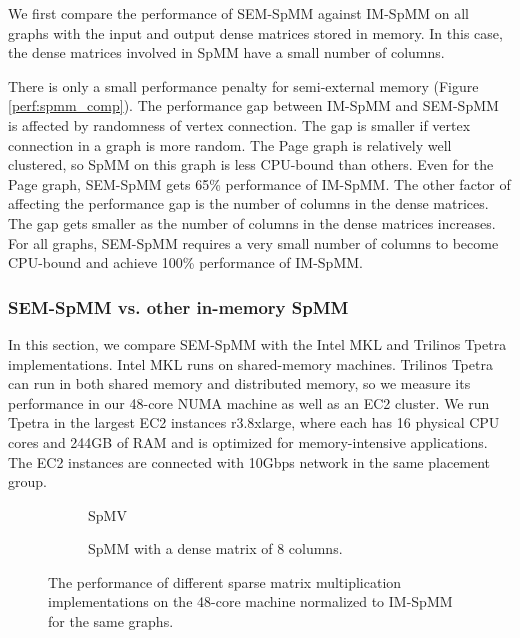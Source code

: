 We first compare the performance of SEM-SpMM against IM-SpMM on all graphs with
the input and output dense matrices stored in memory. In this case, the dense
matrices involved in SpMM have a small number of columns.

There is only a small performance penalty for semi-external memory (Figure
\ref{perf:spmm_comp}). The performance gap between IM-SpMM and SEM-SpMM
is affected by randomness of vertex connection. The gap is smaller if
vertex connection in a graph is more random. The Page graph is relatively
well clustered, so SpMM on this graph is less CPU-bound than others.
Even for the Page graph, SEM-SpMM gets 65\% performance of IM-SpMM.
The other factor of affecting the performance gap is the number of columns
in the dense matrices. The gap gets smaller as the number of columns in
the dense matrices increases. For all graphs, SEM-SpMM requires a very small
number of columns to become CPU-bound and achieve 100\% performance of IM-SpMM.

\subsubsection{SEM-SpMM vs. other in-memory SpMM}
In this section, we compare SEM-SpMM with the Intel MKL and Trilinos Tpetra
implementations. Intel MKL runs on shared-memory machines. Trilinos Tpetra can run in
both shared memory and distributed memory, so we measure its performance in
our 48-core NUMA machine as well as an EC2 cluster. We run Tpetra in the largest
EC2 instances r3.8xlarge, where each has 16 physical CPU cores and 244GB of RAM
and is optimized for memory-intensive applications. The EC2 instances are
connected with 10Gbps network in the same placement group.

\begin{figure}
	\footnotesize
	\centering
	\begin{subfigure}[b]{0.5\textwidth}
		\centering
		
		\vspace{-10pt}
		\caption{SpMV}
		\label{perf:spmv}
	\end{subfigure}
	\begin{subfigure}[b]{0.5\textwidth}
		\centering
		
		\vspace{-10pt}
		\caption{SpMM with a dense matrix of 8 columns.}
		\label{perf:spmm8}
	\end{subfigure}
	\vspace{3pt}
	\caption{The performance of different sparse matrix multiplication
		implementations on the 48-core machine normalized to IM-SpMM for
	the same graphs.}
	\label{perf:spmm}
\end{figure}

